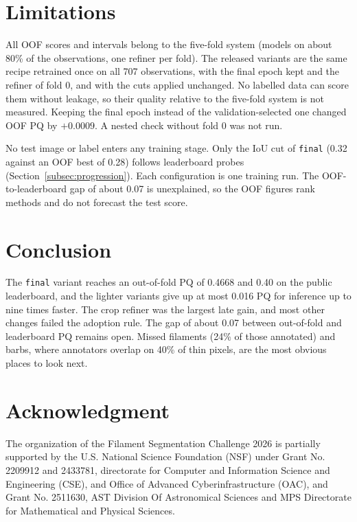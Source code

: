 \documentclass[sigconf,pbalance]{acmart}
\begin{document}
\section{Limitations}\label{sec:limitations}
    \small
    All OOF scores and intervals belong to the five-fold system (models on about 80\% of the observations, one refiner per fold).
    The released variants are the same recipe retrained once on all 707 observations, with the final epoch kept and the refiner of fold 0, and with the cuts applied unchanged.
    No labelled data can score them without leakage, so their quality relative to the five-fold system is not measured.
    Keeping the final epoch instead of the validation-selected one changed OOF PQ by $+0.0009$.
    A nested check without fold 0 was not run.

    No test image or label enters any training stage.
    Only the IoU cut of \texttt{final} (0.32 against an OOF best of 0.28) follows leaderboard probes (Section~\ref{subsec:progression}).
    Each configuration is one training run.
    The OOF-to-leaderboard gap of about 0.07 is unexplained, so the OOF figures rank methods and do not forecast the test score.


    \normalsize

\section{Conclusion}\label{sec:conclusion}
    The \texttt{final} variant reaches an out-of-fold PQ of 0.4668 and 0.40 on the public leaderboard, and the lighter variants give up at most 0.016 PQ for inference up to nine times faster.
    The crop refiner was the largest late gain, and most other changes failed the adoption rule.
    The gap of about 0.07 between out-of-fold and leaderboard PQ remains open.
    Missed filaments (24\% of those annotated) and barbs, where annotators overlap on 40\% of thin pixels, are the most obvious places to look next.


\section{Acknowledgment}\label{sec:acknowledgment}
    The organization of the Filament Segmentation Challenge 2026 is partially supported by the U.S. National Science Foundation (NSF) under Grant No. 2209912 and 2433781, directorate for Computer and Information Science and Engineering (CSE), and Office of Advanced Cyberinfrastructure (OAC), and Grant No. 2511630, AST Division Of Astronomical Sciences and MPS Directorate for Mathematical and Physical Sciences.
\end{document}
